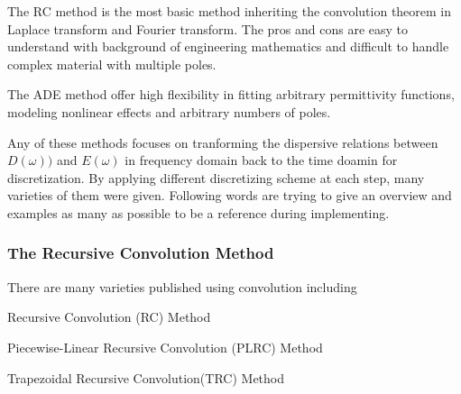 The RC method is the most basic method inheriting the convolution theorem in Laplace transform and Fourier
transform. The pros and cons are easy to understand with background of engineering mathematics and difficult to handle
complex material with multiple poles.

The ADE method offer high flexibility in fitting arbitrary permittivity functions, modeling nonlinear effects and
arbitrary numbers of poles.

Any of these methods focuses on tranforming the dispersive relations between $D(\omega))$ and $E(\omega)$ in frequency domain
back to the time doamin for discretization. By applying different discretizing scheme at each step, many varieties of
them were given. Following words are trying to give an overview and examples as many as possible to be a reference
during implementing.

\subsubsection{The Recursive Convolution Method}
There are many varieties published using convolution including 
\begin{inparaenum}[(1)]
\item Recursive Convolution (RC) Method
\item Piecewise-Linear Recursive Convolution (PLRC) Method
\item Trapezoidal Recursive Convolution(TRC) Method
\end{inparaenum}

